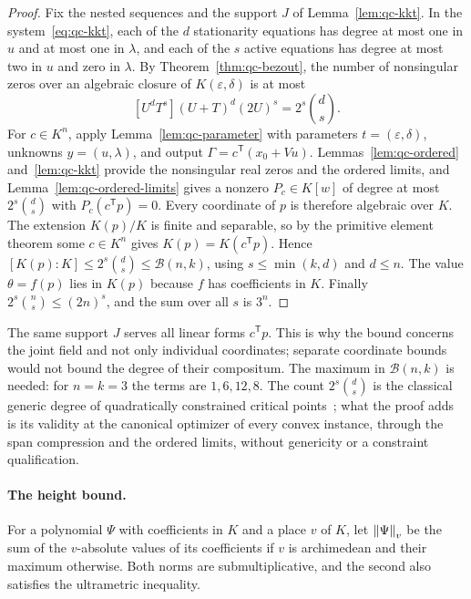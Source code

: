 \begin{proof}
Fix the nested sequences and the support $J$ of Lemma~\ref{lem:qc-kkt}. In
the system~\eqref{eq:qc-kkt}, each of the $d$ stationarity equations has degree
at most one in $u$ and at most one in $\lambda$, and each of the $s$ active
equations has degree at most two in $u$ and zero in $\lambda$. By
Theorem~\ref{thm:qc-bezout}, the number of nonsingular zeros over an algebraic
closure of $K(\varepsilon,\delta)$ is at most
\[
[U^dT^s](U+T)^d(2U)^s=2^s\binom ds .
\]
For $c\in K^n$, apply Lemma~\ref{lem:qc-parameter} with parameters
$t=(\varepsilon,\delta)$, unknowns $y=(u,\lambda)$, and output
$\Gamma=c^{\mathsf T}(x_0+Vu)$. Lemmas~\ref{lem:qc-ordered}
and~\ref{lem:qc-kkt} provide the nonsingular real zeros and the ordered
limits, and Lemma~\ref{lem:qc-ordered-limits} gives a nonzero
$P_c\in K[w]$ of degree at most $2^s\binom ds$ with $P_c(c^{\mathsf T}p)=0$.
Every coordinate of $p$ is therefore algebraic over $K$. The extension
$K(p)/K$ is finite and separable, so by the primitive element theorem some
$c\in K^n$ gives $K(p)=K(c^{\mathsf T}p)$. Hence
$[K(p):K]\le2^s\binom ds\le\mathcal B(n,k)$, using $s\le\min(k,d)$ and
$d\le n$. The value $\theta=f(p)$ lies in $K(p)$ because $f$ has coefficients
in $K$. Finally $2^s\binom ns\le(2n)^s$, and the sum over all $s$ is $3^n$.
\end{proof}

The same support $J$ serves all linear forms $c^{\mathsf T}p$. This is why
the bound concerns the joint field and not only individual coordinates;
separate coordinate bounds would not bound the degree of their compositum.
The maximum in $\mathcal B(n,k)$ is needed: for $n=k=3$ the terms are
$1,6,12,8$. The count $2^s\binom ds$ is the classical generic degree of
quadratically constrained critical points~\cite{NieRanestad2009}; what the
proof adds is its validity at the canonical optimizer of every convex
instance, through the span compression and the ordered limits, without
genericity or a constraint qualification.

\paragraph{The height bound.}
For a polynomial $\Psi$ with coefficients in $K$ and a place $v$ of $K$, let
$\left\lVert\Psi\right\rVert_v$ be the sum of the $v$-absolute values of its coefficients if
$v$ is archimedean and their maximum otherwise. Both norms are
submultiplicative, and the second also satisfies the ultrametric inequality.

